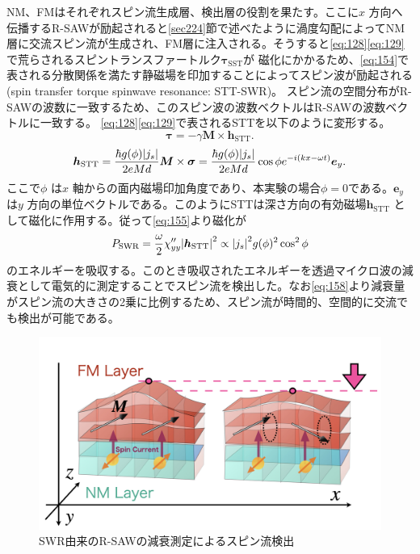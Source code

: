 \documentclass[dvipdfmx,11pt]{jsreport}
\numberwithin{equation}{chapter}
\numberwithin{table}{chapter}
\begin{document}
NM、FMはそれぞれスピン流生成層、検出層の役割を果たす。ここに$x$ 方向へ伝播するR-SAWが励起されると\ref{sec224}節で述べたように渦度勾配によってNM層に交流スピン流が生成され、FM層に注入される。そうすると\eqref{eq:128}\eqref{eq:129}で荒らされるスピントランスファートルク$\bm{\tau}_\text{SST} $が
磁化にかかるため、\eqref{eq:154}で表される分散関係を満たす静磁場を印加することによってスピン波が励起される(spin transfer torque spinwave resonance: STT-SWR)。
スピン流の空間分布がR-SAWの波数に一致するため、このスピン波の波数ベクトルはR-SAWの波数ベクトルに一致する。
\eqref{eq:128}\eqref{eq:129}で表されるSTTを以下のように変形する。
\begin{equation}
\label{eq:156}
	\bm{\tau}=-\gamma \bm{M}\times \bm{\bm{h}}_\text{STT} 
.\end{equation}
\begin{equation}
\label{eq:157}
\bm{h}_\text{STT} =\frac{\hbar g(\phi)\abs{j_s}}{2eMd}\bm{M}\times \bm{\sigma}=\frac{\hbar g(\phi)\abs{j_s}}{2eMd}\cos \phi e^{-i(kx-\omega t)}\bm{e}_y
.\end{equation}
ここで$\phi$ は$x$ 軸からの面内磁場印加角度であり、本実験の場合$\phi=0$である。$\bm{e}_y$ は$y$ 方向の単位ベクトルである。このようにSTTは深さ方向の有効磁場$\bm{h}_\text{STT} $ として磁化に作用する。従って\eqref{eq:155}より磁化が
\begin{equation}
\label{eq:158}
	P_\text{SWR}= \frac{\omega}{2}\chi_{yy}''\abs{\bm{h}_\text{STT} }^2 \propto \abs{j_s}^2g(\phi)^2\cos ^2\phi
\end{equation}
のエネルギーを吸収する。このとき吸収されたエネルギーを透過マイクロ波の減衰として電気的に測定することでスピン流を検出した。なお\eqref{eq:158}より減衰量がスピン流の大きさの2乗に比例するため、スピン流が時間的、空間的に交流でも検出が可能である。

\begin{figure}[H]
	\centering
	\includegraphics[width=\textwidth]{fig/fig.012.jpeg}
	\caption{SWR由来のR-SAWの減衰測定によるスピン流検出}
	\label{fig:fig-fig-012-jpeg}
\end{figure}
\end{document}
